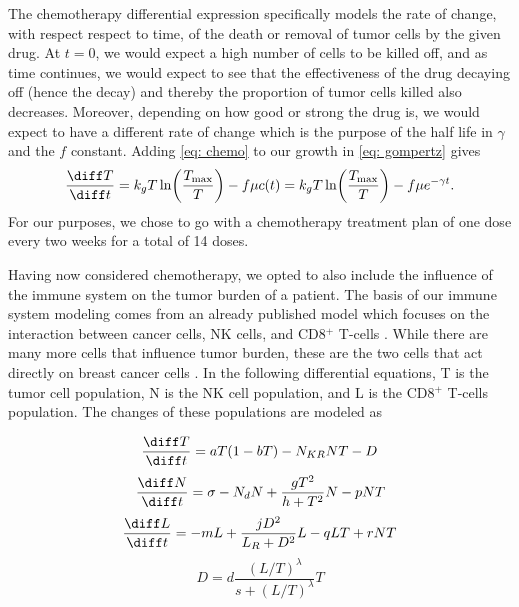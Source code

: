 \documentclass[11pt]{amsart}
\begin{document}
The chemotherapy differential expression specifically models the rate of change, with respect respect to time, of the death or removal of tumor cells by the given drug.
At $t=0$, we would expect a high number of cells to be killed off, and as time continues, we would expect to see that the effectiveness of the drug decaying off (hence the decay) and thereby the proportion of tumor cells killed also decreases.
Moreover, depending on how good or strong the drug is, we would expect to have a different rate of change which is the purpose of the half life in $\gamma$ and the $f$ constant.
Adding \eqref{eq: chemo} to our growth in \eqref{eq: gompertz} gives 
\begin{equation}
	\frac{\diff T}{\diff t} = k_g T \ln \biggl(\frac{T_{\max}}{T} \biggr) - f \mu c(t) =k_g T \ln \biggl(\frac{T_{\max}}{T} \biggr) - f \mu e^{-\gamma t} \label{eq: gompertz-chemo}.
\end{equation}
For our purposes, we chose to go with a chemotherapy treatment plan of one dose every two weeks for a total of 14 doses. 

Having now considered chemotherapy, we opted to also include the influence of the immune system on the tumor burden of a patient. The basis of our immune system modeling comes from an already published model which focuses on the interaction between cancer cells, NK cells, and CD8$^+$ T-cells \cite{Immune}. While there are many more cells that influence tumor burden, these are the two cells that act directly on breast cancer cells \cite{Amens21}. In the following differential equations, T is the tumor cell population, N is the NK cell population, and L is the CD8$^+$ T-cells population. The changes of these populations are modeled as

\begin{equation} 
	\frac{\diff T}{\diff t} = aT(1-bT) - N_{KR}NT - D \label{eq:dT}
\end{equation}
\begin{equation} \label{eq:dN}
	\frac{\diff N}{\diff t} = \sigma - N_dN +\frac{gT^2}{h + T^2}N - pNT
\end{equation}
\begin{equation} \label{eq:dL}
	\frac{\diff L}{\diff t} = - mL +\frac{jD^2}{L_R + D^2}L - qLT + rNT
\end{equation}
\begin{equation} \label{eq: D}
	D = d\frac{(L/T)^\lambda}{s + (L/T)^\lambda}T
\end{equation}
\end{document}
